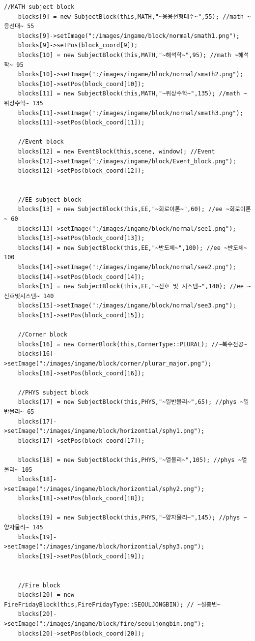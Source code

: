 \documentclass[10pt,oneside,a4paper,titlepage]{article}
\begin{document}
\begin{lstlisting}[escapeinside=~~]
    //MATH subject block
    blocks[9] = new SubjectBlock(this,MATH,"~응용선형대수~",55); //math ~응선대~ 55
    blocks[9]->setImage(":/images/ingame/block/normal/smath1.png");
    blocks[9]->setPos(block_coord[9]);
    blocks[10] = new SubjectBlock(this,MATH,"~해석학~",95); //math ~해석학~ 95
    blocks[10]->setImage(":/images/ingame/block/normal/smath2.png");
    blocks[10]->setPos(block_coord[10]);
    blocks[11] = new SubjectBlock(this,MATH,"~위상수학~",135); //math ~위상수학~ 135
    blocks[11]->setImage(":/images/ingame/block/normal/smath3.png");
    blocks[11]->setPos(block_coord[11]);

    //Event block
    blocks[12] = new EventBlock(this,scene, window); //Event
    blocks[12]->setImage(":/images/ingame/block/Event_block.png");
    blocks[12]->setPos(block_coord[12]);


    //EE subject block
    blocks[13] = new SubjectBlock(this,EE,"~회로이론~",60); //ee ~회로이론~ 60
    blocks[13]->setImage(":/images/ingame/block/normal/see1.png");
    blocks[13]->setPos(block_coord[13]);
    blocks[14] = new SubjectBlock(this,EE,"~반도체~",100); //ee ~반도체~ 100
    blocks[14]->setImage(":/images/ingame/block/normal/see2.png");
    blocks[14]->setPos(block_coord[14]);
    blocks[15] = new SubjectBlock(this,EE,"~신호 및 시스템~",140); //ee ~신호및시스템~ 140
    blocks[15]->setImage(":/images/ingame/block/normal/see3.png");
    blocks[15]->setPos(block_coord[15]);

    //Corner block
    blocks[16] = new CornerBlock(this,CornerType::PLURAL); //~복수전공~
    blocks[16]->setImage(":/images/ingame/block/corner/plurar_major.png");
    blocks[16]->setPos(block_coord[16]);

    //PHYS subject block
    blocks[17] = new SubjectBlock(this,PHYS,"~일반물리~",65); //phys ~일반물리~ 65
    blocks[17]->setImage(":/images/ingame/block/horizontial/sphy1.png");
    blocks[17]->setPos(block_coord[17]);

    blocks[18] = new SubjectBlock(this,PHYS,"~열물리~",105); //phys ~열물리~ 105
    blocks[18]->setImage(":/images/ingame/block/horizontial/sphy2.png");
    blocks[18]->setPos(block_coord[18]);

    blocks[19] = new SubjectBlock(this,PHYS,"~양자물리~",145); //phys ~양자물리~ 145
    blocks[19]->setImage(":/images/ingame/block/horizontial/sphy3.png");
    blocks[19]->setPos(block_coord[19]);


    //Fire block
    blocks[20] = new FireFridayBlock(this,FireFridayType::SEOULJONGBIN); // ~설종빈~
    blocks[20]->setImage(":/images/ingame/block/fire/seouljongbin.png");
    blocks[20]->setPos(block_coord[20]);


\end{lstlisting}
\end{document}
